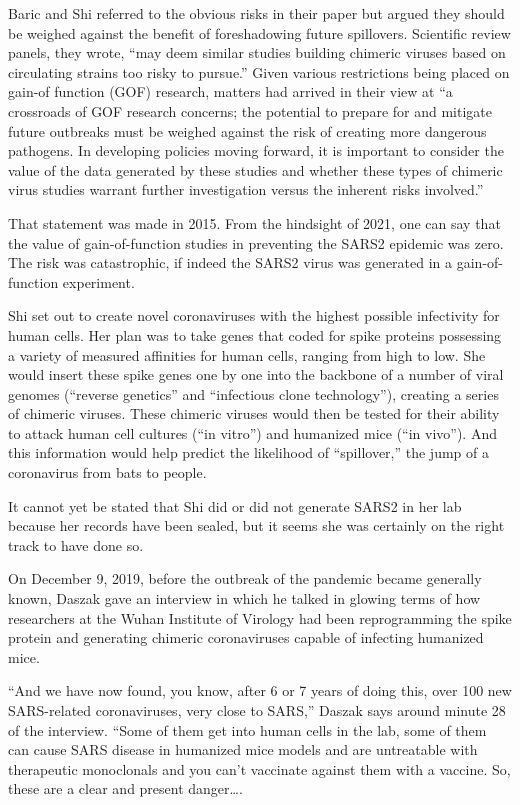 \documentclass[
]{book}
\begin{document}
Baric and Shi referred to the obvious risks in their paper but argued they should be weighed against the benefit of foreshadowing future spillovers. Scientific review panels, they wrote, ``may deem similar studies building chimeric viruses based on circulating strains too risky to pursue.'' Given various restrictions being placed on gain-of function (GOF) research, matters had arrived in their view at ``a crossroads of GOF research concerns; the potential to prepare for and mitigate future outbreaks must be weighed against the risk of creating more dangerous pathogens. In developing policies moving forward, it is important to consider the value of the data generated by these studies and whether these types of chimeric virus studies warrant further investigation versus the inherent risks involved.''

That statement was made in 2015. From the hindsight of 2021, one can say that the value of gain-of-function studies in preventing the SARS2 epidemic was zero. The risk was catastrophic, if indeed the SARS2 virus was generated in a gain-of-function experiment.

Shi set out to create novel coronaviruses with the highest possible infectivity for human cells. Her plan was to take genes that coded for spike proteins possessing a variety of measured affinities for human cells, ranging from high to low. She would insert these spike genes one by one into the backbone of a number of viral genomes (``reverse genetics'' and ``infectious clone technology''), creating a series of chimeric viruses. These chimeric viruses would then be tested for their ability to attack human cell cultures (``in vitro'') and humanized mice (``in vivo''). And this information would help predict the likelihood of ``spillover,'' the jump of a coronavirus from bats to people.

It cannot yet be stated that Shi did or did not generate SARS2 in her lab because her records have been sealed, but it seems she was certainly on the right track to have done so.

On December 9, 2019, before the outbreak of the pandemic became generally known, Daszak gave an interview in which he talked in glowing terms of how researchers at the Wuhan Institute of Virology had been reprogramming the spike protein and generating chimeric coronaviruses capable of infecting humanized mice.

``And we have now found, you know, after 6 or 7 years of doing this, over 100 new SARS-related coronaviruses, very close to SARS,'' Daszak says around minute 28 of the interview. ``Some of them get into human cells in the lab, some of them can cause SARS disease in humanized mice models and are untreatable with therapeutic monoclonals and you can't vaccinate against them with a vaccine. So, these are a clear and present danger\ldots.
\end{document}
